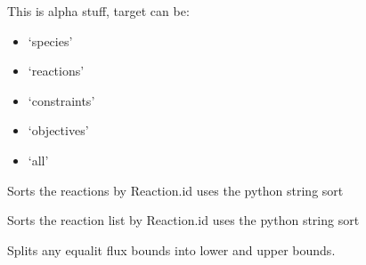 \documentclass[a4paper,11pt,english]{sphinxmanual}
\begin{document}
\begin{fulllineitems}
\begin{fulllineitems}
\begin{itemize}
\end{itemize}

\end{fulllineitems}


\begin{fulllineitems}
\label{modules_doc:cbmpy.CBModel.Model.setSuffix}
This is alpha stuff, target can be:
\begin{itemize}
\item {} 
`species'

\item {} 
`reactions'

\item {} 
`constraints'

\item {} 
`objectives'

\item {} 
`all'

\end{itemize}

\end{fulllineitems}


\begin{fulllineitems}
\label{modules_doc:cbmpy.CBModel.Model.sortReactionsById}
Sorts the reactions by Reaction.id uses the python string sort

\end{fulllineitems}


\begin{fulllineitems}
\label{modules_doc:cbmpy.CBModel.Model.sortSpeciesById}
Sorts the reaction list by Reaction.id uses the python string sort

\end{fulllineitems}


\begin{fulllineitems}
\label{modules_doc:cbmpy.CBModel.Model.splitEqualityFluxBounds}
Splits any equalit flux bounds into lower and upper bounds.


\end{fulllineitems}
\end{fulllineitems}
\end{document}

